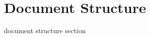\documentclass[../../../../dd.tex]{subfiles}
\begin{document}
	\section{Document Structure}

	document structure section
\end{document}
